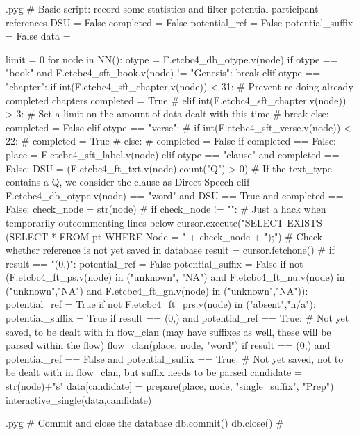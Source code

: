 \documentclass{report}
\makeatletter
\newenvironment{python}{%
  \VerbatimEnvironment
  \minted@resetoptions
  \setkeys{minted@opt}{}
      \begin{VerbatimOut}{\jobname.pyg}}
{%
      \end{VerbatimOut}
      \minted@pygmentize{python}
      \DeleteFile{\jobname.pyg}}
\makeatother
\begin{document}
\begin{python}
# Basic script: record some statistics and filter potential participant references
DSU = False
completed = False
potential_ref = False
potential_suffix = False
data = {}

limit = 0
for node in NN():
    otype = F.etcbc4_db_otype.v(node)
    if otype == "book" and F.etcbc4_sft_book.v(node) != "Genesis":
        break
    elif otype == "chapter":
        if int(F.etcbc4_sft_chapter.v(node)) < 31:    # Prevent re-doing already completed chapters
            completed = True
#        elif int(F.etcbc4_sft_chapter.v(node)) > 3:    # Set a limit on the amount of data dealt with this time
#            break
        else:
            completed = False 
    elif otype == "verse":
#        if int(F.etcbc4_sft_verse.v(node)) < 22:
#           completed = True
#        else:
#           completed = False
        if completed == False:
            place = F.etcbc4_sft_label.v(node)
    elif otype == "clause" and completed == False:
        DSU = (F.etcbc4_ft_txt.v(node).count("Q") > 0)    # If the text_type contains a Q, we consider the clause as Direct Speech
    elif F.etcbc4_db_otype.v(node) == "word" and DSU == True and completed == False:
        check_node = str(node)
#        if check_node != "":     # Just a hack when temporarily outcommenting lines below
        cursor.execute("SELECT EXISTS (SELECT * FROM pt WHERE Node = " + check_node + ");") # Check whether reference is not yet saved in database
        result = cursor.fetchone()
#        if result == "(0,)":
        potential_ref = False
        potential_suffix = False
        if not (F.etcbc4_ft_ps.v(node) in ("unknown", "NA") and F.etcbc4_ft_nu.v(node) in ("unknown","NA") and F.etcbc4_ft_gn.v(node) in ("unknown","NA")):
            potential_ref = True
        if not F.etcbc4_ft_prs.v(node) in ("absent","n/a"):
            potential_suffix = True
        if result == (0,) and potential_ref == True: # Not yet saved, to be dealt with in flow_clan (may have suffixes as well, these will be parsed within the flow)
            flow_clan(place, node, "word")
        if result == (0,) and potential_ref == False and potential_suffix == True: # Not yet saved, not to be dealt with in flow_clan, but suffix needs to be parsed
            candidate = str(node)+"s"
            data[candidate] = prepare(place, node, "single_suffix", "Prep")
            interactive_single(data,candidate)

\end{python}

\begin{python}
#{{{ Commit and close the database
db.commit()
db.close()
#}}}
\end{python}
\end{document}
